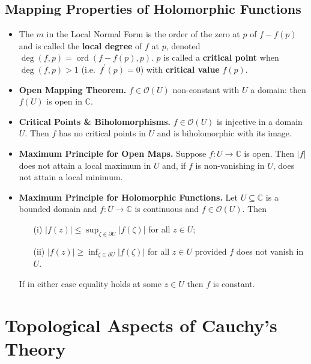 \documentclass{article}
\DeclareMathOperator{\order}{ord}
\DeclareMathOperator{\degree}{deg}
\newenvironment{topic}[1]{%
{\subsection{#1}}%
\begin{itemize}%
}{%
\end{itemize}%
}
\newcommand{\theorem}[1]{\item {\bf #1.}}
\newcommand{\corollary}[1]{\item {\bf #1.}}
\newcommand{\term}[1]{{\bf #1}}
\newcommand{\holo}[1]{\mathcal{O}(#1)}
\newcommand{\remark}{\item}
\begin{document}
\begin{topic}{Mapping Properties of Holomorphic Functions}
\remark The $m$ in the Local Normal Form is the order of the zero at $p$ of $f - f(p)$ and is called the \term{local degree} of $f$ at $p$, denoted $\degree(f, p) = \order(f - f(p), p)$. $p$ is called a \term{critical point} when $\degree(f, p) > 1$ (i.e.\ $f^\prime(p) = 0$) with \term{critical value} $f(p)$.

\theorem{Open Mapping Theorem} $f \in \holo{U}$ non-constant with $U$ a domain: then $f(U)$ is open in $\mathbb{C}$.

\corollary{Critical Points \& Biholomorphisms} $f \in \holo{U}$ is injective in a domain $U$. Then $f$ has no critical points in $U$ and is biholomorphic with its image.

\theorem{Maximum Principle for Open Maps} Suppose $f : U \to \mathbb{C}$ is open. Then $|f|$ does not attain a local maximum in $U$ and, if $f$ is non-vanishing in $U$, does not attain a local minimum.

\theorem{Maximum Principle for Holomorphic Functions} Let $U \subseteq \mathbb{C}$ is a bounded domain and $f : \overline{U} \to \mathbb{C}$ is continuous and $f \in \holo{U}$. Then
\begin{enumerate}
\item[(i)] $|f(z)| \leq \sup_{\zeta \in \partial U} |f(\zeta)|$ for all $z \in U$;
\item[(ii)] $|f(z)| \geq \inf_{\zeta \in \partial U} |f(\zeta)|$ for all $z \in U$ provided $f$ does not vanish in $U$.
\end{enumerate}
If in either case equality holds at some $z \in U$ then $f$ is constant.

\end{topic}


\newpage
\section{Topological Aspects of Cauchy's Theory}
\end{document}
